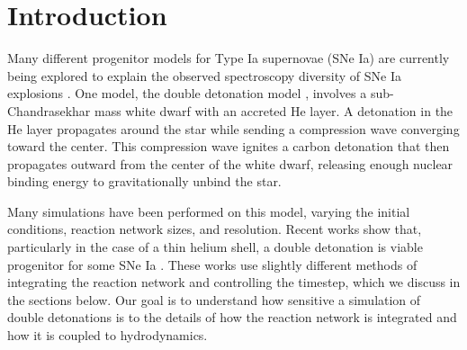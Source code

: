 \documentclass[preprint,linenumbers]{aastex631}
\begin{document}

\section{Introduction}\label{Sec:Introduction}

Many different progenitor models for Type Ia supernovae (SNe Ia) 
are currently being explored to explain the observed spectroscopy diversity of SNe Ia explosions \citep{taubenberger:2017}. One model, the double detonation model
\citep{NOMOTO82,WOO_WEAV84}, involves a sub-Chandrasekhar mass white dwarf with an accreted He layer. A detonation in the $\mathrm{He}$ layer propagates
around the star while sending a compression wave converging toward the
center.  This compression wave ignites a carbon detonation that then
propagates outward from the center of the white dwarf, releasing enough
nuclear binding energy to gravitationally unbind the star.

Many simulations have been performed on this model, varying the initial conditions, reaction network sizes, and resolution. Recent works show
that, particularly in the case of a thin helium shell, a double detonation is viable progenitor for some SNe Ia \citep{fink:2007,mollwoosley:2013,shenbildsten:2014,glasner:2018,shen:2018,polin:2019,townsley:2019,kushnirkatz:2020,gronow:2020,gronow:2021,boos:2021,roy:2022,rivas:2022}.  These works use slightly different methods of integrating the reaction network and controlling the timestep, which we discuss in the sections below.  Our goal is to understand how sensitive a simulation of double detonations is to the details of how the reaction
network is integrated and how it is coupled to hydrodynamics.
\end{document}
